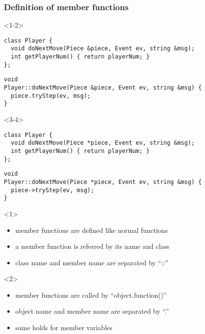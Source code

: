 \documentclass{slides}
\begin{document}
\begin{frame}[fragile]
  \frametitle{Definition of member functions}

  \begin{onlyenv}<1-2>
\begin{lstlisting}[title=Player.hpp]
class Player {
  void doNextMove(Piece &piece, Event ev, string &msg);
  int getPlayerNum() { return playerNum; }
};
\end{lstlisting}

\begin{lstlisting}[title=Player.cpp]
void
Player::doNextMove(Piece &piece, Event ev, string &msg) {
  piece.tryStep(ev, msg);
}
\end{lstlisting}
  \end{onlyenv}
  \begin{onlyenv}<3-4>
\begin{lstlisting}[title=Player.hpp]
class Player {
  void doNextMove(Piece *piece, Event ev, string &msg);
  int getPlayerNum() { return playerNum; }
};
\end{lstlisting}

\begin{lstlisting}[title=Player.cpp]
void
Player::doNextMove(Piece *piece, Event ev, string &msg) {
  piece->tryStep(ev, msg);
}
\end{lstlisting}
  \end{onlyenv}

  \begin{onlyenv}<1>
    \begin{itemize}
    \item member functions are defined like normal functions
    \item a member function is referred by its name and class
    \item class name and member name are separated by ``::''
    \end{itemize}
  \end{onlyenv}

  \begin{onlyenv}<2>
    \begin{itemize}
    \item member functions are called by ``object.function()''
    \item object name and member name are separated by ``.''
    \item same holds for member variables
    \end{itemize}
  \end{onlyenv}


\end{frame}
\end{document}
